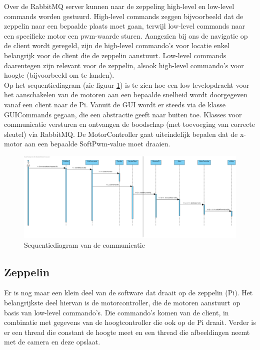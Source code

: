 \documentclass[eind]{penoverslag}
\begin{document}
Over de RabbitMQ server kunnen naar de zeppeling high-level en low-level commands worden gestuurd. High-level commands zeggen bijvoorbeeld dat de zeppelin naar een bepaalde plaats moet gaan, terwijl low-level commands naar een specifieke motor een pwm-waarde sturen. Aangezien bij ons de navigatie op de client wordt geregeld, zijn de high-level commando's voor locatie enkel belangrijk voor de client die de zeppelin aanstuurt. Low-level commands daarentegen zijn relevant voor de zeppelin, alsook high-level commando's voor hoogte (bijvoorbeeld om te landen). \\

Op het sequentiediagram (zie figuur \ref{Sequence}) is te zien hoe een low-levelopdracht voor het aanschakelen van de motoren aan een bepaalde snelheid wordt doorgegeven vanaf een client naar de Pi. Vanuit de GUI wordt er steeds via de klasse GUICommands gegaan, die een abstractie geeft naar buiten toe. Klasses voor communicatie versturen en ontvangen de boodschap (met toevoeging van correcte sleutel) via RabbitMQ. De MotorController gaat uiteindelijk bepalen dat de x-motor aan een bepaalde SoftPwm-value moet draaien.
\\

\begin{figure}[H]
\begin{center}
\includegraphics[width=1\textwidth]{PiToClientCommunication.png}
\end{center}
\caption{Sequentiediagram van de communicatie}
\label{Sequence}
\end{figure} 

\subsection{Zeppelin}
Er is nog maar een klein deel van de software dat draait op de zeppelin (Pi). Het belangrijkste deel hiervan is de motorcontroller, die de motoren aanstuurt op basis van low-level commando's. Die commando's komen van de client, in combinatie met gegevens van de hoogtcontroller die ook op de Pi draait. Verder is er een thread die constant de hoogte meet en een thread die afbeeldingen neemt met de camera en deze opslaat. \\
\end{document}
